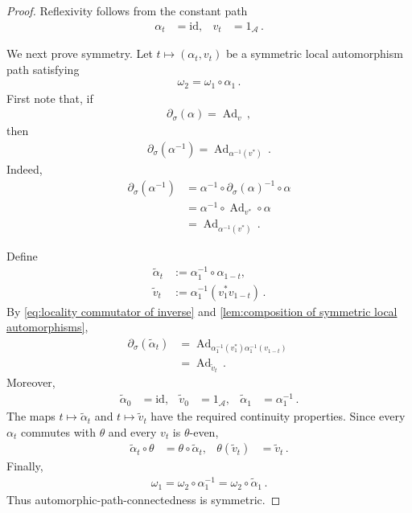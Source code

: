\documentclass[a4paper,10pt]{article}
\numberwithin{equation}{section}
\theoremstyle{plain}
\theoremstyle{plain}
\theoremstyle{plain}
\theoremstyle{plain}
\theoremstyle{plain}
\theoremstyle{remark}
\theoremstyle{definition}
\newcommand{\calA}{\mathcal{A}}
\newcommand{\Ad}[1]{\operatorname{Ad}_{#1}}
\newcommand{\eq}[1]{\begin{align*}#1\end{align*}}
\newcommand{\eql}[1]{\begin{align}#1\end{align}}
\newcommand{\br}[1]{\left(#1\right)}
\begin{document}
\begin{proof}
Reflexivity follows from the constant path
\eq{
    \alpha_t
    &=
    \mathrm{id},&
    v_t
    &=
    1_\calA\,.
}

We next prove symmetry. Let
\(t\mapsto(\alpha_t,v_t)\) be a symmetric local automorphism path
satisfying
\eq{
    \omega_2
    =
    \omega_1\circ\alpha_1\,.
}
First note that, if
\eq{
    \partial_\sigma(\alpha)
    =
    \Ad{v}\, ,
}
then
\eql{\label{eq:locality commutator of inverse}
    \partial_\sigma(\alpha^{-1})
    =
    \Ad{\alpha^{-1}(v^*)}\,.
}
Indeed,
\eq{
    \partial_\sigma(\alpha^{-1})
    &=
    \alpha^{-1}\circ
    \partial_\sigma(\alpha)^{-1}
    \circ\alpha\\
    &=
    \alpha^{-1}\circ\Ad{v^*}\circ\alpha\\
    &=
    \Ad{\alpha^{-1}(v^*)}\,.
}

Define
\eq{
    \widetilde\alpha_t
    &:=
    \alpha_1^{-1}\circ\alpha_{1-t},\\
    \widetilde v_t
    &:=
    \alpha_1^{-1}
    \br{
        v_1^*v_{1-t}
    }\,.
}
By \cref{eq:locality commutator of inverse} and
\cref{lem:composition of symmetric local automorphisms},
\eq{
    \partial_\sigma(\widetilde\alpha_t)
    &=
    \Ad{
        \alpha_1^{-1}(v_1^*)
        \alpha_1^{-1}(v_{1-t})
    }\\
    &=
    \Ad{\widetilde v_t}\,.
}
Moreover,
\eq{
    \widetilde\alpha_0
    &=
    \mathrm{id},&
    \widetilde v_0
    &=
    1_\calA,&
    \widetilde\alpha_1
    &=
    \alpha_1^{-1}\,.
}
The maps \(t\mapsto\widetilde\alpha_t\) and
\(t\mapsto\widetilde v_t\) have the required continuity properties.
Since every \(\alpha_t\) commutes with \(\theta\) and every \(v_t\)
is \(\theta\)-even,
\eq{
    \widetilde\alpha_t\circ\theta
    &=
    \theta\circ\widetilde\alpha_t,&
    \theta(\widetilde v_t)
    &=
    \widetilde v_t\,.
}
Finally,
\eq{
    \omega_1
    =
    \omega_2\circ\alpha_1^{-1}
    =
    \omega_2\circ\widetilde\alpha_1\,.
}
Thus automorphic-path-connectedness is symmetric.


\end{proof}
\end{document}
